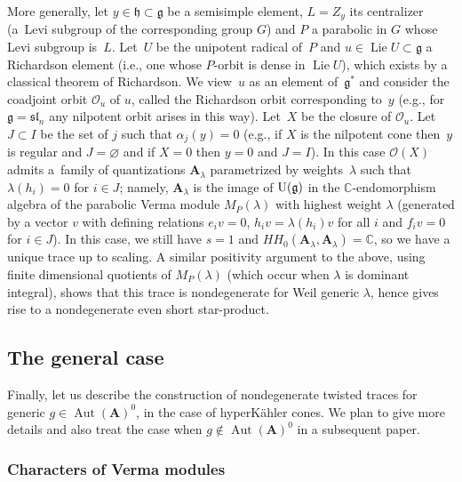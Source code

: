 \documentclass[pdftex]{sigma}
\numberwithin{equation}{section}
\newcommand{\g}{\mathfrak{g}}
\newcommand{\h}{\mathfrak{h}}
\begin{document}
\begin{Remark}\label{rich}  More generally, let $y\in \h\subset \g$ be a semisimple element, $L=Z_y$ its centralizer (a~Levi subgroup of the corresponding group $G$) and $P$ a parabolic in $G$ whose Levi subgroup is~$L$. Let~$U$ be the unipotent radical of~$P$ and $u\in \operatorname{Lie}U\subset \g$ a Richardson element (i.e., one whose $P$-orbit is dense in $\operatorname{Lie}U$), which exists by a classical theorem of Richardson. We view~$u$ as an element of~$\g^*$ and consider the coadjoint orbit $\mathcal{O}_u$ of $u$, called the Richardson orbit corresponding to~$y$ (e.g., for $\g=\mathfrak{sl}_n$ any nilpotent orbit arises in this way). Let~$X$ be the closure of $\mathcal{O}_u$. Let $J\subset I$ be the set of $j$ such that $\alpha_j(y)=0$ (e.g., if $X$ is the nilpotent cone then~$y$ is regular and $J=\varnothing$ and if $X=0$ then $y=0$ and $J=I$). In this case $\mathcal O(X)$ admits a~family of quantizations ${\mathbf A}_\lambda$ parametrized by weights~$\lambda$ such that $\lambda(h_i)=0$ for $i\in J$; namely, ${\mathbf A}_\lambda$ is the image of ${\rm U}(\g)$ in the ${\mathbb C}$-endomorphism algebra of the parabolic Verma module $M_P(\lambda)$ with highest weight $\lambda$ (generated by a vector $v$ with defining relations
$e_iv=0$, $h_iv=\lambda(h_i)v$ for all $i$ and $f_iv=0$ for $i\in J$). In this case, we still have $s=1$ and $HH_0({\mathbf A}_\lambda,{\mathbf A}_\lambda)={\mathbb C}$, so we have a unique trace up to scaling. A similar positivity argument to the above, using finite dimensional quotients of $M_P(\lambda)$ (which occur when $\lambda$ is dominant integral), shows that this trace is nondegenerate for Weil generic $\lambda$, hence gives rise to a nondegenerate even short star-product.
\end{Remark}

\subsection{The general case}

Finally, let us describe the construction of nondegenerate twisted traces for generic $g\in \operatorname{Aut}({\mathbf A})^0$, in the case of hyperK\"ahler cones. We plan to give more details and also treat the case when $g\notin \operatorname{Aut}({\mathbf A})^0$ in a subsequent paper.

\subsubsection{Characters of Verma modules}
\end{document}
